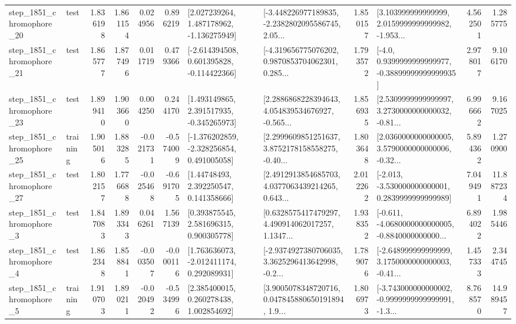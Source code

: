 \begin{tabular}{llrrrrllrlrr}
 step\_1851\_chromophore\_20 &      test &      1.836198 &    1.861154 &      0.024956 &  0.896219 &    [2.027239264, 1.487178962, -1.136275949] &  [-3.448226977189835, -2.2382802095586745, 2.05... &       1.850157 &  [3.103999999999999, 2.0159999999999982, -1.953... &            4.562501 &          1.285775 \\
 step\_1851\_chromophore\_21 &      test &      1.865777 &    1.877496 &      0.011719 &  0.479366 &   [-2.614394508, 0.601395828, -0.114422366] &  [-4.319656775076202, 0.9870853704062301, 0.285... &       1.793572 &   [-4.0, 0.9399999999999977, -0.38899999999999935] &            2.978017 &          9.106170 \\
 step\_1851\_chromophore\_23 &      test &      1.899410 &    1.903660 &      0.004250 &  0.244170 &    [1.493149865, 2.391517935, -0.345265973] &  [2.2886868228394643, 4.054839534676927, -0.565... &       1.856935 &  [2.5309999999999997, 3.2730000000000032, -0.81... &            6.996662 &          9.167025 \\
 step\_1851\_chromophore\_25 &  training &      1.905016 &    1.883285 &     -0.021731 & -0.574009 &   [-1.376202859, -2.328256854, 0.491005058] &  [2.2999609851251637, 3.8752178158558275, -0.40... &       1.803648 &  [2.0360000000000005, 3.5790000000000006, -0.32... &            5.894362 &          1.270900 \\
 step\_1851\_chromophore\_27 &      test &      1.802157 &    1.776688 &     -0.025468 & -0.691705 &      [1.44748493, 2.392250547, 0.141358666] &  [2.4912913854685703, 4.0377063439214265, 0.643... &       2.012262 &   [-2.013, -3.530000000000001, 0.2839999999999989] &            7.049491 &         11.887234 \\
  step\_1851\_chromophore\_3 &      test &      1.847083 &    1.893343 &      0.046261 &  1.567139 &     [0.393875545, 2.581696315, 0.900305778] &  [0.6328575417479297, 4.490914062017257, 1.1347... &       1.938352 &  [-0.611, -4.0680000000000005, -0.8840000000000... &            6.894022 &          1.985446 \\
  step\_1851\_chromophore\_4 &      test &      1.862348 &    1.858841 &     -0.003507 & -0.000116 &    [1.763636073, -2.012411174, 0.292089931] &  [-2.9374927380706035, 3.3625296413642998, -0.2... &       1.789076 &  [-2.648999999999999, 3.1750000000000003, -0.41... &            1.457333 &          2.344745 \\
  step\_1851\_chromophore\_5 &  training &      1.910703 &    1.890211 &     -0.020492 & -0.534996 &     [2.385400015, 0.260278438, 1.002854692] &  [3.9005078348720716, 0.047845880650191894, 1.9... &       1.806973 &  [-3.743000000000002, -0.9999999999999991, -1.3... &            8.768570 &         14.989457 \\

\end{tabular}
